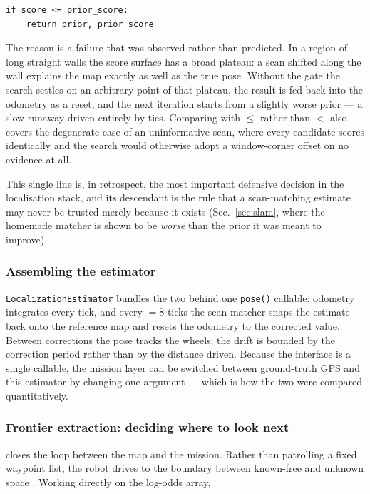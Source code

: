 \begin{lstlisting}[style=python]
if score <= prior_score:
    return prior, prior_score
\end{lstlisting}

The reason is a failure that was observed rather than predicted. In a
region of long straight walls the score surface has a broad plateau: a
scan shifted along the wall explains the map exactly as well as the true
pose. Without the gate the search settles on an arbitrary point of that
plateau, the result is fed back into the odometry as a reset, and the
next iteration starts from a slightly worse prior --- a slow runaway
driven entirely by ties. Comparing with $\le$ rather than $<$ also
covers the degenerate case of an uninformative scan, where every
candidate scores identically and the search would otherwise adopt a
window-corner offset on no evidence at all.

This single line is, in retrospect, the most important defensive
decision in the localisation stack, and its \phaseB{} descendant is the
rule that a scan-matching estimate may never be trusted merely because
it exists (Sec.~\ref{sec:slam}, where the homemade matcher is shown to
be \emph{worse} than the prior it was meant to improve).

\subsubsection{Assembling the estimator}

\texttt{LocalizationEstimator} bundles the two behind one \texttt{pose()}
callable: odometry integrates every tick, and every
 $= 8$ ticks the scan matcher snaps the estimate
back onto the reference map and resets the odometry to the corrected
value. Between corrections the pose tracks the wheels; the drift is
bounded by the correction period rather than by the distance driven.
Because the interface is a single callable, the mission layer can be
switched between ground-truth GPS and this estimator by changing one
argument --- which is how the two were compared quantitatively.

\subsubsection{Frontier extraction: deciding where to look next}

 closes the loop between the map and the
mission. Rather than patrolling a fixed waypoint list, the robot drives
to the boundary between known-free and unknown space
\cite{yamauchi1997frontier}. Working directly on the log-odds array,

